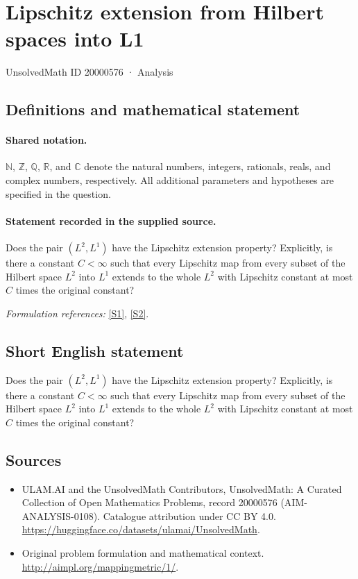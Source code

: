 \documentclass[11pt]{article}
\newcommand{\sref}[2]{\hyperlink{source:#1:#2}{[S#2]}}
\begin{document}
\setcounter{section}{20000575}
\section{Lipschitz extension from Hilbert spaces into L1}\label{20000576}
{\small UnsolvedMath ID 20000576 · Analysis}
\subsection{Definitions and mathematical statement}

\paragraph{Shared notation.}$\mathbb N$, $\mathbb Z$, $\mathbb Q$, $\mathbb R$, and $\mathbb C$ denote the natural numbers, integers, rationals, reals, and complex numbers, respectively. All additional parameters and hypotheses are specified in the question.


\paragraph{Statement recorded in the supplied source.}
Does the pair $(L^2,L^1)$ have the Lipschitz extension property? Explicitly, is there a constant $C<\infty$ such that every Lipschitz map from every subset of the Hilbert space $L^2$ into $L^1$ extends to the whole $L^2$ with Lipschitz constant at most $C$ times the original constant?
\par\smallskip\textit{Formulation references:} \sref{20000576}{1}, \sref{20000576}{2}.
\subsection{Short English statement}
Does the pair $(L^2,L^1)$ have the Lipschitz extension property? Explicitly, is there a constant $C<\infty$ such that every Lipschitz map from every subset of the Hilbert space $L^2$ into $L^1$ extends to the whole $L^2$ with Lipschitz constant at most $C$ times the original constant?
\subsection{Sources}
\begin{itemize}
\item[\hypertarget{source:20000576:1}{S1}] ULAM.AI and the UnsolvedMath Contributors, UnsolvedMath: A Curated Collection of Open Mathematics Problems, record 20000576 (AIM-ANALYSIS-0108). Catalogue attribution under CC BY 4.0.
\url{https://huggingface.co/datasets/ulamai/UnsolvedMath}.
\item[\hypertarget{source:20000576:2}{S2}] Original problem formulation and mathematical context.
\url{http://aimpl.org/mappingmetric/1/}.
\end{itemize}
\label{end:20000576}
\end{document}
